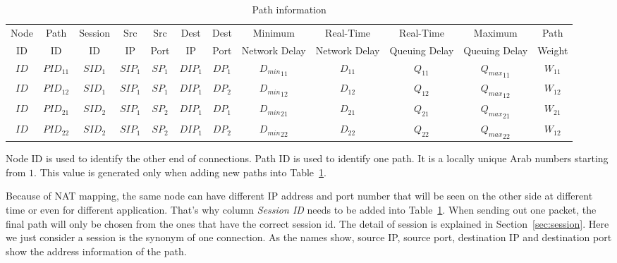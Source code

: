 \begin{table}
\small
\caption{\label{tb.pi}Path information}
\centering
\begin{tabular}{|c|c|c|c|c|c|c|c|c|c|c|c|}
\hline
Node &  Path & Session & Src &   Src & Dest & Dest &   Minimum       & Real-Time      & Real-Time      & Maximum       & Path   \\
 ID  &   ID  & ID & IP  &  Port &  IP  & Port &  Network Delay  & Network Delay  & Queuing Delay  & Queuing Delay & Weight \\
\hline
$ID$&${PID}_{11}$&${SID}_{1}$&${SIP}_{1}$&${SP}_{1}$&${DIP}_{1}$&${DP}_{1}$&${D_{min}}_{11}$&$D_{11}$&${Q}_{11}$&${{Q}_{max}}_{11}$&$W_{11}$\\
\hline
$ID$&${PID}_{12}$&${SID}_{1}$&${SIP}_{1}$&${SP}_{1}$&${DIP}_{1}$&${DP}_{2}$&${D_{min}}_{12}$&$D_{12}$&${Q}_{12}$&${{Q}_{max}}_{12}$&$W_{12}$\\
\hline
$ID$&${PID}_{21}$&${SID}_{2}$&${SIP}_{1}$&${SP}_{2}$&${DIP}_{1}$&${DP}_{1}$&${D_{min}}_{21}$&$D_{21}$&${Q}_{21}$&${{Q}_{max}}_{21}$&$W_{21}$\\
\hline
$ID$&${PID}_{22}$&${SID}_{2}$&${SIP}_{1}$&${SP}_{2}$&${DIP}_{1}$&${DP}_{2}$&${D_{min}}_{22}$&$D_{22}$&${Q}_{22}$&${{Q}_{max}}_{22}$&$W_{12}$\\
\hline
\end{tabular}
\end{table}

Node ID is used to identify the other end of connections. Path ID is used to identify one path. It is a locally unique Arab numbers starting from $1$. This value is generated only when adding new paths into Table~\ref{tb.pi}.

Because of NAT mapping, the same node can have different IP address and port number that will be seen on the other side at different time or even for different application. That's why column \emph{Session ID} needs to be added into Table~\ref{tb.pi}. When sending out one packet, the final path will only be chosen from the ones that have the correct session id. The detail of session is explained in Section~\ref{sec:session}. Here we just consider a session is the synonym of one connection. As the names show, source IP, source port, destination IP and destination port show the address information of the path.


